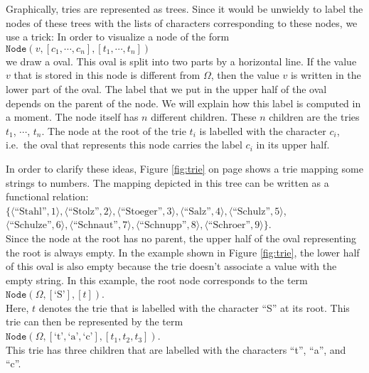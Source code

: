 Graphically, tries are represented as trees.  Since it would be unwieldy to label the nodes of these
trees with the lists of characters corresponding to these nodes, we use a trick:  In order to
visualize a node of the form \\[0.2cm]
\hspace*{1.3cm} 
$\texttt{Node}(v, [c_1, \cdots, c_n], [t_1, \cdots, t_n])$ \\[0.2cm]
we draw a oval.  This oval is split into two parts by a horizontal line.
If the value  $v$ that is stored in this node is different from $\Omega$, then the value $v$ is
written in the lower part of the oval.  The label that we put in the upper half of the oval
depends on the parent of the node.  We will explain how this label is computed in a moment.
The node itself has $n$ different children.  These $n$ children are the tries
$t_1$, $\cdots$, $t_n$.  The node at the root of the trie $t_i$ is labelled with the character $c_i$,
i.e.~the oval that represents this node carries the label $c_i$ in its upper half.

In order to clarify these ideas, Figure  \ref{fig:trie} on page \pageref{fig:trie} shows a trie
mapping some strings to numbers.  The mapping depicted in this tree can be written as a functional
relation: 
\\[0.2cm]
\hspace*{1.3cm} $ \bigl\{ \langle \textrm{``Stahl''},   1  \rangle, \langle \textrm{``Stolz''},     2  \rangle, \langle \textrm{``Stoeger''},   3  \rangle, 
             \langle \textrm{``Salz''},      4  \rangle, \langle \textrm{``Schulz''},    5  \rangle$, \\[0.2cm]
\hspace*{1.5cm} $\langle \textrm{``Schulze''},   6  \rangle, \langle \textrm{``Schnaut''},   7  \rangle, 
  \langle \textrm{``Schnupp''},   8  \rangle, 
  \langle \textrm{``Schroer''},   9  \rangle\}$. \\[0.2cm]
Since the node at the root has no parent, the upper half of  the oval representing the root is
always empty.  In the example shown in Figure \ref{fig:trie}, the lower half of this oval is also empty
because the trie doesn't associate a value with the empty string.  In this example, the root node corresponds
to the term  
\\[0.2cm]
\hspace*{1.3cm}
 $\texttt{Node}(\Omega,[\textrm{`S'}], [t])$. 
\\[0.2cm]
Here,  $t$ denotes the trie that is labelled with the character  ``S'' at its root.
This trie can then be represented by the term  \\[0.2cm]
\hspace*{1.3cm} 
$\texttt{Node}(\Omega,[\textrm{`t'},\textrm{`a'},\textrm{`c'}], [t_1, t_2, t_3])$. \\[0.2cm]
This trie has three children that are labelled with the characters  ``t'', ``a'', and ``c''.

